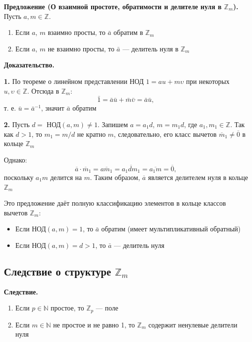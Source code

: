 \documentclass[a4paper,12pt]{article}
\theoremstyle{definition}
\theoremstyle{plain}
\theoremstyle{remark}
\begin{document}
	\noindent \textbf{Предложение (О взаимной простоте, обратимости и делителе нуля в $\mathbb{Z}_m$).}
	Пусть $a, m \in \mathbb{Z}$.
	\begin{enumerate}
		\item Если $a$, $m$ взаимно просты, то $\bar{a}$ обратим в $\mathbb{Z}_m$
		\item Если $a$, $m$ не взаимно просты, то $\bar{a}$ — делитель нуля в $\mathbb{Z}_m$
	\end{enumerate}
	
	\medskip
	\noindent \textbf{Доказательство.}
	
	\textbf{1.} По теореме о линейном представлении НОД $1 = au + m\upsilon$ при некоторых $u, \upsilon \in \mathbb{Z}$. Отсюда в $\mathbb{Z}_m$:
	\[
	\bar{1} = \bar{a}\bar{u} + \bar{m}\bar{\upsilon} = \bar{a}\bar{u},
	\]
	т. е. $\bar{u} = \bar{a}^{-1}$, значит $\bar{a}$ обратим
	
	
	
		
	\textbf{2.} Пусть $d =$ НОД$(a, m) \neq 1$. Запишем $a = a_1d$, $m = m_1d$, где $a_1, m_1 \in \mathbb{Z}$. Так как $d > 1$, то $m_1 = m/d$ не кратно $m$, следовательно, его класс вычетов $\overline{m}_1 \neq \overline{0}$ в кольце $\mathbb{Z}_m$
	
	Однако:
	\[
	\overline{a} \cdot \overline{m}_1 = \overline{am_1} = \overline{a_1 d m_1} = \overline{a_1 m} = \overline{0},
	\]
	поскольку $a_1 m$ делится на $m$. Таким образом, $\overline{a}$ является делителем нуля в кольце $\mathbb{Z}_m$
	
	
	
	
	
	
	\begin{tcolorbox}[colback=green!5, colframe=green!50!black, title=Пояснение]
		Это предложение даёт полную классификацию элементов в кольце классов вычетов $\mathbb{Z}_m$:
		\begin{itemize}
			\item Если НОД$(a, m) = 1$, то $\bar{a}$ обратим (имеет мультипликативный обратный)
			\item Если НОД$(a, m) = d > 1$, то $\bar{a}$ — делитель нуля
		\end{itemize}
	\end{tcolorbox}
	
	\subsection{Следствие о структуре $\mathbb{Z}_m$}
	
	\noindent \textbf{Следствие.}
	\begin{enumerate}
		\item Если $p \in \mathbb{N}$ простое, то $\mathbb{Z}_p$ — поле
		\item Если $m \in \mathbb{N}$ не простое и не равно 1, то $\mathbb{Z}_m$ содержит ненулевые делители нуля
	\end{enumerate}
	
\end{document}
